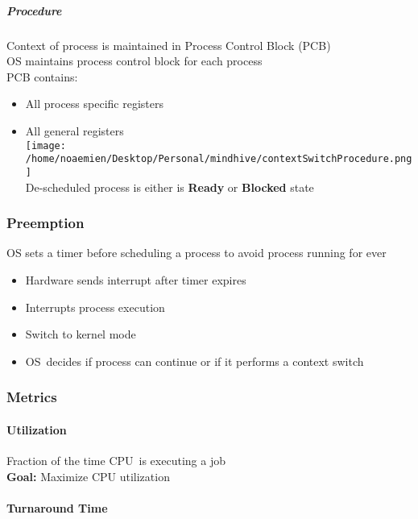 \documentclass[
]{article}
\providecommand{\tightlist}{%
  \setlength{\itemsep}{0pt}\setlength{\parskip}{0pt}}
\begin{document}
\hypertarget{procedure}{%
\subparagraph{Procedure}\label{procedure}}

Context of process is maintained in Process Control Block (PCB)\\
OS maintains process control block for each process\\
PCB contains:

\begin{itemize}
\tightlist
\item
  All process specific registers
\item
  All general registers\\
  \texttt{[image: /home/noaemien/Desktop/Personal/mindhive/contextSwitchProcedure.png]}\\
  De-scheduled process is either is \textbf{Ready} or \textbf{Blocked}
  state
\end{itemize}

\hypertarget{preemption}{%
\subsubsection{Preemption}\label{preemption}}

OS sets a timer before scheduling a process to avoid process running for
ever

\begin{itemize}
\tightlist
\item
  Hardware sends interrupt after timer expires
\item
  Interrupts process execution
\item
  Switch to kernel mode
\item
  OS~decides if process can continue or if it performs a context switch
\end{itemize}

\hypertarget{metrics}{%
\subsubsection{Metrics}\label{metrics}}

\hypertarget{utilization}{%
\paragraph{Utilization}\label{utilization}}

Fraction of the time CPU~is executing a job\\
\textbf{Goal:} Maximize CPU utilization

\hypertarget{turnaround-time}{%
\paragraph{Turnaround Time}\label{turnaround-time}}
\end{document}
